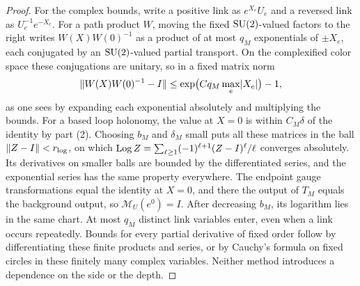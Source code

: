 \begin{proof}
For the complex bounds, write a positive link as $e^{X_e}U_e$ and a reversed link as $U_e^{-1}e^{-X_e}$. For a path product $W$, moving the fixed $\mathrm{SU}(2)$-valued factors to the right writes $W(X)W(0)^{-1}$ as a product of at most $q_M$ exponentials of $\pm X_e$, each conjugated by an $\mathrm{SU}(2)$-valued partial transport. On the complexified color space these conjugations are unitary, so in a fixed matrix norm
\[
 \lVert W(X)W(0)^{-1}-I\rVert\le\exp\bigl(Cq_M\max_e\lvert X_e\rvert\bigr)-1,
\]
as one sees by expanding each exponential absolutely and multiplying the bounds. For a based loop holonomy, the value at $X=0$ is within $C_M\delta$ of the identity by part (2). Choosing $b_M$ and $\delta_M$ small puts all these matrices in the ball $\lVert Z-I\rVert<r_{\log}$, on which $\operatorname{Log} Z=\sum_{\ell\ge1}(-1)^{\ell+1}(Z-I)^\ell/\ell$ converges absolutely. Its derivatives on smaller balls are bounded by the differentiated series, and the exponential series has the same property everywhere. The endpoint gauge transformations equal the identity at $X=0$, and there the output of $T_M$ equals the background output, so $\mathscr M_U(e^0)=I$. After decreasing $b_M$, its logarithm lies in the same chart. At most $q_M$ distinct link variables enter, even when a link occurs repeatedly. Bounds for every partial derivative of fixed order follow by differentiating these finite products and series, or by Cauchy's formula on fixed circles in these finitely many complex variables. Neither method introduces a dependence on the side or the depth.
\end{proof}

